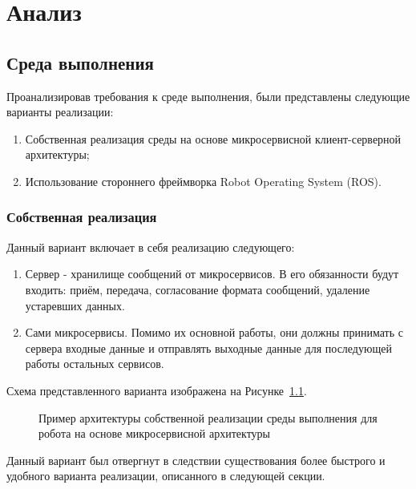 \chapter{Анализ}\label{ch:ch2}

\section{Среда выполнения}\label{sec:ch2/sec1}

Проанализировав требования к среде выполнения, были представлены следующие варианты реализации:
\begin{enumerate}[beginpenalty=10000] %
  \item Собственная реализация среды на основе микросервисной клиент-серверной архитектуры;
  \item Использование стороннего фреймворка Robot Operating System (ROS).
\end{enumerate}

\subsection{Собственная реализация}
Данный вариант включает в себя реализацию следующего: 
\begin{enumerate}[beginpenalty=10000] %
  \item Сервер - хранилище сообщений от микросервисов. В его обязанности будут входить: приём, передача, согласование формата сообщений, удаление устаревших данных.
  \item Сами микросервисы. Помимо их основной работы, они должны принимать с сервера входные данные и отправлять выходные данные для последующей работы остальных сервисов.
\end{enumerate}

Схема представленного варианта изображена на Рисунке~\cref{fig:microservice}.

\begin{figure}[ht]
    \caption{Пример архитектуры собственной реализации среды выполнения для робота на основе микросервисной архитектуры}\label{fig:microservice}
\end{figure}

Данный вариант был отвергнут в следствии существования более быстрого и удобного варианта реализации, описанного в следующей секции.

